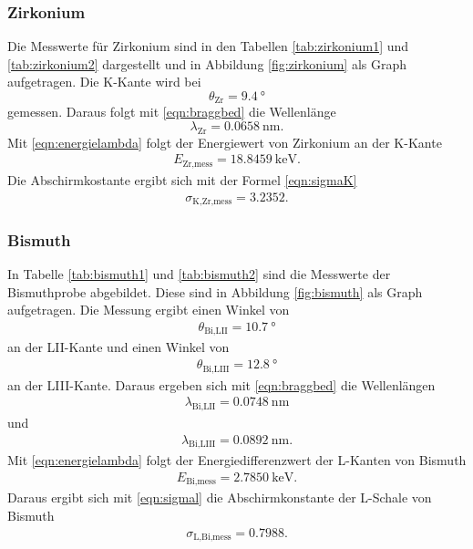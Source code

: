 \subsubsection{Zirkonium}

Die Messwerte für Zirkonium sind in den Tabellen \ref{tab:zirkonium1} und
\ref{tab:zirkonium2} dargestellt und
in Abbildung \ref{fig:zirkonium} als Graph aufgetragen.
Die K-Kante wird bei
\begin{equation}
  \theta_\text{Zr} = \SI{9.4}{\degree}
\end{equation}
gemessen.
Daraus folgt mit \eqref{eqn:braggbed} die Wellenlänge
\begin{equation}
  \lambda_\text{Zr} = \SI{0.0658}{\nano\meter}.
\end{equation}
Mit \eqref{eqn:energielambda} folgt der Energiewert von Zirkonium an der
K-Kante
\begin{align}
  E_\text{Zr,mess} = \SI{18.8459}{\kilo\electronvolt}.
\end{align}
Die Abschirmkostante ergibt sich mit der Formel \eqref{eqn:sigmaK}
\begin{align}
  \sigma_\text{K,Zr,mess} = 3.2352.
\end{align}

\subsubsection{Bismuth}

In Tabelle \ref{tab:bismuth1} und \ref{tab:bismuth2} sind die Messwerte der
Bismuthprobe abgebildet.
Diese sind in Abbildung \ref{fig:bismuth} als Graph aufgetragen.
Die Messung ergibt einen Winkel von
\begin{align}
  \theta_\text{Bi,LII} = \SI{10.7}{\degree}
\end{align}
an der LII-Kante und einen Winkel von
\begin{align}
  \theta_\text{Bi,LIII} = \SI{12.8}{\degree}
\end{align}
an der LIII-Kante.
Daraus ergeben sich mit \eqref{eqn:braggbed} die Wellenlängen
\begin{align}
  \lambda_\text{Bi,LII} = \SI{0.0748}{\nano\meter}
\end{align}
und
\begin{align}
  \lambda_\text{Bi,LIII} = \SI{0.0892}{\nano\meter}.
\end{align}
Mit \eqref{eqn:energielambda} folgt der Energiedifferenzwert der L-Kanten von
Bismuth
\begin{align}
  E_\text{Bi,mess} = \SI{2.7850}{\kilo\electronvolt}.
\end{align}
Daraus ergibt sich mit \eqref{eqn:sigmal} die Abschirmkonstante der L-Schale
von Bismuth
\begin{align}
  \sigma_\text{L,Bi,mess} = 0.7988.
\end{align}

